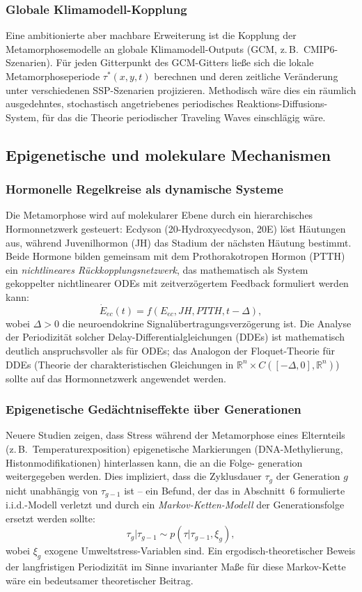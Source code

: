 ﻿\documentclass[12pt, a4paper]{article}
\theoremstyle{definition}
\newcommand{\R}{\mathbb{R}}
\begin{document}
\subsubsection{Globale Klimamodell-Kopplung}
Eine ambitionierte aber machbare Erweiterung ist die Kopplung der Metamorphosemodelle
an globale Klimamodell-Outputs (GCM, z.\,B.\ CMIP6-Szenarien). Für jeden
Gitterpunkt des GCM-Gitters ließe sich die lokale Metamorphoseperiode $\tau^*(x,y,t)$
berechnen und deren zeitliche Veränderung unter verschiedenen SSP-Szenarien
projizieren. Methodisch wäre dies ein räumlich ausgedehntes, stochastisch
angetriebenes periodisches Reaktions-Diffusions-System, für das die Theorie
periodischer Traveling Waves einschlägig wäre.

\subsection{Epigenetische und molekulare Mechanismen}

\subsubsection{Hormonelle Regelkreise als dynamische Systeme}
Die Metamorphose wird auf molekularer Ebene durch ein hierarchisches
Hormonnetzwerk gesteuert: Ecdyson (20-Hydroxyecdyson, 20E) löst Häutungen aus,
während Juvenilhormon (JH) das Stadium der nächsten Häutung bestimmt. Beide
Hormone bilden gemeinsam mit dem Prothorakotropen Hormon (PTTH) ein
\emph{nichtlineares Rückkopplungsnetzwerk}, das mathematisch als System
gekoppelter nichtlinearer ODEs mit zeitverzögertem Feedback formuliert werden
kann:
\[
  \dot{E}_{ec}(t) = f(E_{ec}, JH, PTTH, t-\Delta),
\]
wobei $\Delta > 0$ die neuroendokrine Signalübertragungsverzögerung ist. Die Analyse
der Periodizität solcher Delay-Differentialgleichungen (DDEs) ist mathematisch
deutlich anspruchsvoller als für ODEs; das Analogon der Floquet-Theorie für DDEs
(Theorie der charakteristischen Gleichungen in $\R^n \times C([-\Delta, 0], \R^n)$)
sollte auf das Hormonnetzwerk angewendet werden.

\subsubsection{Epigenetische Gedächtniseffekte über Generationen}
Neuere Studien \cite{Jablonka2005} zeigen, dass Stress während der Metamorphose
eines Elternteils (z.\,B.\ Temperaturexposition) epigenetische Markierungen
(DNA-Methylierung, Histonmodifikationen) hinterlassen kann, die an die Folge-
generation weitergegeben werden. Dies impliziert, dass die Zyklusdauer $\tau_g$
der Generation $g$ nicht unabhängig von $\tau_{g-1}$ ist -- ein Befund, der
das in Abschnitt~6 formulierte i.i.d.-Modell verletzt und durch ein
\emph{Markov-Ketten-Modell} der Generationsfolge ersetzt werden sollte:
\[
  \tau_g | \tau_{g-1} \sim p(\tau | \tau_{g-1}, \xi_g),
\]
wobei $\xi_g$ exogene Umweltstress-Variablen sind. Ein ergodisch-theoretischer
Beweis der langfristigen Periodizität im Sinne invarianter Maße für diese
Markov-Kette wäre ein bedeutsamer theoretischer Beitrag.
\end{document}
